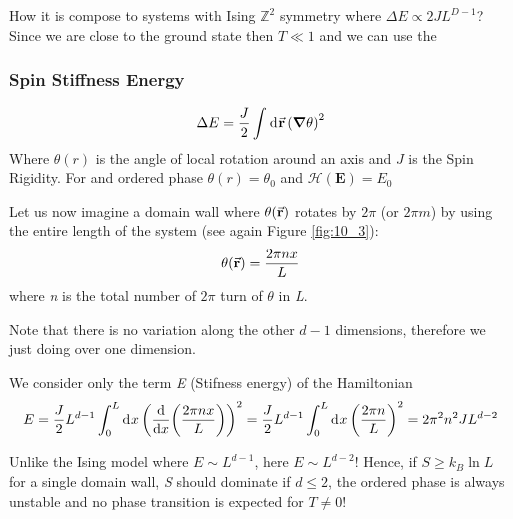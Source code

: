 \documentclass[../../Main/Main.tex]{subfiles}
\begin{document}
How it is compose to systems with Ising $\mathbb{Z}^{2}$ symmetry where $\Delta E \propto 2JL^{D-1}$? Since we are close to the ground state then $T \ll 1$ and we can use the
\subsubsection{Spin Stiffness Energy}
  \begin{equation}
    \Delta E = \frac{J}{2} \int_{}^{} \dd[]{\va{r}} \qty(\grad \theta )^2
  \end{equation}
Where $\theta(r)$ is the angle of local rotation around an axis and $J$ is the Spin Rigidity. For and ordered phase $\theta(r) = \theta_0$ and $\mathcal{H}(\mathbf{E}) = E_{0}$

Let us now imagine a domain wall where \(\theta (\va{r})  \)  rotates by \( 2 \pi  \) (or \( 2 \pi m \)) by using the entire length of the system (see again Figure \ref{fig:10_3}):
\begin{equation*}
  \theta (\va{r}) = \frac{2 \pi n x}{L}
\end{equation*}
where \emph{n} is the total number of \( 2 \pi  \) turn of \( \theta  \) in \emph{L}. 
\begin{remark}
Note that there is no variation along the other \( d-1 \) dimensions, therefore we just doing over one dimension.
\end{remark}

We consider only the term \emph{E} (Stifness energy) of the Hamiltonian 
 \begin{equation}
   E = \frac{J}{2} L^{d-1} \int_{0}^{L} \dd[]{x} \qty(\dv{}{x} \qty(\frac{2 \pi n x}{L})  )^2 = \frac{J}{2} L^{d-1} \int_{0}^{L} \dd[]{x} \qty(\frac{2 \pi n}{L})^2 = 2 \pi ^2 n^2 J L^{d-2}
 \end{equation}
\begin{remark}
Unlike the Ising model where \( E \sim L^{d-1} \), here \( E \sim L^{d-2} \)! Hence, if \( S \ge k_B \ln{L}  \) for a single domain wall, \emph{S} should dominate if \( d \le 2 \), the ordered phase is always unstable and no phase transition is expected for \( T \neq 0 \)!
\end{remark}
\end{document}
